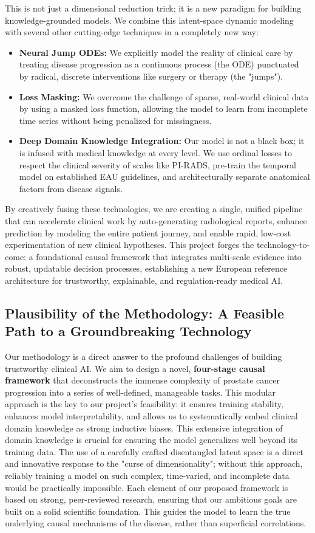 \documentclass[11pt, a4paper]{article}
\begin{document}
This is not just a dimensional reduction trick; it is a new paradigm for building knowledge-grounded models. We combine this latent-space dynamic modeling with several other cutting-edge techniques in a completely new way:
\begin{itemize}
    \item \textbf{Neural Jump ODEs:} We explicitly model the reality of clinical care by treating disease progression as a continuous process (the ODE) punctuated by radical, discrete interventions like surgery or therapy (the "jumps").
    \item \textbf{Loss Masking:} We overcome the challenge of sparse, real-world clinical data by using a masked loss function, allowing the model to learn from incomplete time series without being penalized for missingness.
    \item \textbf{Deep Domain Knowledge Integration:} Our model is not a black box; it is infused with medical knowledge at every level. We use ordinal losses to respect the clinical severity of scales like PI-RADS, pre-train the temporal model on established EAU guidelines, and architecturally separate anatomical factors from disease signals.
\end{itemize}

By creatively fusing these technologies, we are creating a single, unified pipeline that can accelerate clinical work by auto-generating radiological reports, enhance prediction by modeling the entire patient journey, and enable rapid, low-cost experimentation of new clinical hypotheses. This project forges the technology-to-come: a foundational causal framework that integrates multi-scale evidence into robust, updatable decision processes, establishing a new European reference architecture for trustworthy, explainable, and regulation-ready medical AI.

\subsection{Plausibility of the Methodology: A Feasible Path to a Groundbreaking Technology}
Our methodology is a direct answer to the profound challenges of building trustworthy clinical AI. We aim to design a novel, \textbf{four-stage causal framework} that deconstructs the immense complexity of prostate cancer progression into a series of well-defined, manageable tasks. This modular approach is the key to our project's feasibility: it ensures training stability, enhances model interpretability, and allows us to systematically embed clinical domain knowledge as strong inductive biases. This extensive integration of domain knowledge is crucial for ensuring the model generalizes well beyond its training data. The use of a carefully crafted disentangled latent space is a direct and innovative response to the "curse of dimensionality"; without this approach, reliably training a model on such complex, time-varied, and incomplete data would be practically impossible. Each element of our proposed framework is based on strong, peer-reviewed research, ensuring that our ambitious goals are built on a solid scientific foundation. This guides the model to learn the true underlying causal mechanisms of the disease, rather than superficial correlations.
\end{document}
